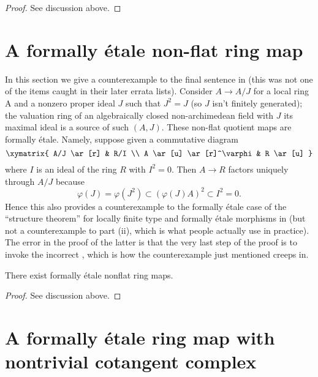 \begin{proof}
See discussion above.
\end{proof}


\section{A formally \'etale non-flat ring map}
\label{section-formally-etale-nonflat}

\noindent
In this section we give a counterexample to the final sentence in
\cite[0${}_{\rm{IV}}$, Example 19.10.3(i)]{EGA}
(this was not one of the items caught in their
later errata lists). Consider $A \to A/J$ for a local ring A and a nonzero
proper ideal $J$ such that $J^2 = J$ (so $J$ isn't finitely generated); the
valuation ring of an algebraically closed non-archimedean field with $J$
its maximal ideal is a source of such $(A, J)$. These non-flat quotient
maps are formally \'etale. Namely, suppose given a commutative diagram
$$
\xymatrix{
A/J \ar[r] & R/I \\
A \ar[u] \ar[r]^\varphi & R \ar[u]
}
$$
where $I$ is an ideal of the ring $R$ with $I^2 = 0$. Then $A \to R$
factors uniquely through $A/J$ because
$$
\varphi(J) = \varphi(J^2) \subset (\varphi(J)A)^2 \subset I^2 = 0.
$$
Hence this also provides a counterexample to the formally \'etale case
of the ``structure theorem'' for locally finite type and formally \'etale
morphisms in \cite[IV, Theorem 18.4.6(i)]{EGA}
(but not a counterexample to part (ii), which
is what people actually use in practice). The error in the proof of
the latter is that the very last step of the proof is to invoke the incorrect
\cite[0${}_{\rm{IV}}$, Example 19.3.10(i)]{EGA},
which is how the counterexample just mentioned creeps in.

\begin{lemma}
\label{lemma-formally-etale-not-presented}
There exist formally \'etale nonflat ring maps.
\end{lemma}

\begin{proof}
See discussion above.
\end{proof}



\section{A formally \'etale ring map with nontrivial cotangent complex}
\label{section-formally-etale-nontrivial-cotangent-complex}

